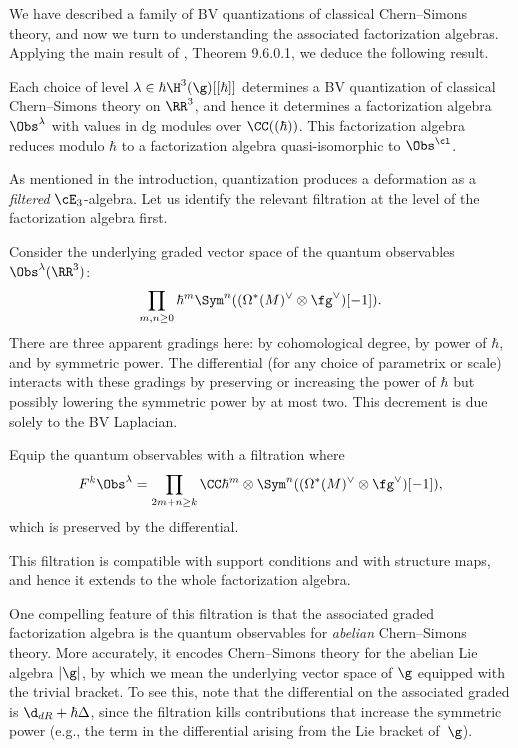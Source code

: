 \documentclass[10pt]{amsart}
\begin{document}
We have described a family of BV quantizations of classical Chern--Simons theory,
and now we turn to understanding the associated factorization algebras.
Applying the main result of \cite{CG2}, Theorem 9.6.0.1,
we deduce the following result.

\begin{prp}
\label{prp: CS quant exists}
Each choice of level $\lambda \in \hbar \H^3(\g)[[\hbar]]$ determines a BV quantization of classical Chern--Simons theory on $\RR^3$, 
and hence it determines a factorization algebra $\Obs^\lambda$ with values in dg modules over $\CC((\hbar))$.
This factorization algebra reduces modulo $\hbar$ to a factorization algebra quasi-isomorphic to $\Obs^\cl$.
\end{prp}

As mentioned in the introduction, 
quantization produces a deformation as a {\em filtered} $\cE_3$-algebra.
Let us identify the relevant filtration at the level of the factorization algebra first.

Consider the underlying graded vector space of the quantum observables $\Obs^\lambda(\RR^3)$:
\[
\prod_{m,n \geq 0}  \hbar^m \Sym^n((\Omega^*(M)^\vee \otimes \fg^\vee)[-1]).
\]
There are three apparent gradings here: by cohomological degree, by power of $\hbar$, and by symmetric power.
The differential (for any choice of parametrix or scale) interacts with these gradings by preserving or increasing the power of $\hbar$ but possibly lowering the symmetric power by at most two.
This decrement is due solely to the BV Laplacian.

\begin{dfn}
\label{dfn: obs filtration}
Equip the quantum observables with a filtration where
\[
F^k \Obs^\lambda = \prod_{2m + n \geq k} \CC \hbar^m \otimes \Sym^n((\Omega^*(M)^\vee \otimes \fg^\vee)[-1]),
\]
which is preserved by the differential.
\end{dfn}

This filtration is compatible with support conditions and with structure maps, and hence it extends to the whole factorization algebra.

One compelling feature of this filtration is that the associated graded factorization algebra 
is the quantum observables for {\em abelian} Chern--Simons theory.
More accurately, it encodes Chern--Simons theory for the abelian Lie algebra $|\g|$,
by which we mean the underlying vector space of $\g$ equipped with the trivial bracket.
To see this, note that the differential on the associated graded is $\d_{dR} + \hbar \Delta$,
since the filtration kills contributions that increase the symmetric power 
(e.g., the term in the differential arising from the Lie bracket of~$\g$).
\end{document}
